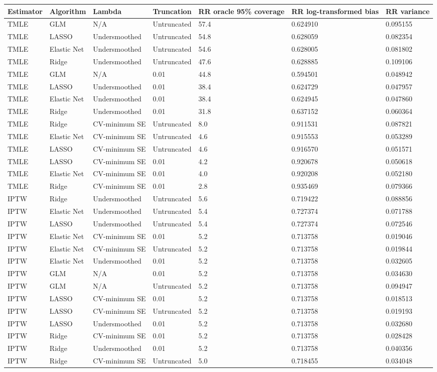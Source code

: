 
\begin{longtable}[l]{lllllll}
\toprule
Estimator & Algorithm & Lambda & Truncation & RR oracle 95\% coverage & RR log-transformed bias & RR variance\\
\midrule
TMLE & GLM & N/A & Untruncated & 57.4 & 0.624910 & 0.095155\\
TMLE & LASSO & Undersmoothed & Untruncated & 54.8 & 0.628059 & 0.082354\\
TMLE & Elastic Net & Undersmoothed & Untruncated & 54.6 & 0.628005 & 0.081802\\
TMLE & Ridge & Undersmoothed & Untruncated & 47.6 & 0.628885 & 0.109106\\
TMLE & GLM & N/A & 0.01 & 44.8 & 0.594501 & 0.048942\\
TMLE & LASSO & Undersmoothed & 0.01 & 38.4 & 0.624729 & 0.047957\\
TMLE & Elastic Net & Undersmoothed & 0.01 & 38.4 & 0.624945 & 0.047860\\
TMLE & Ridge & Undersmoothed & 0.01 & 31.8 & 0.637152 & 0.060364\\
TMLE & Ridge & CV-minimum SE & Untruncated & 8.0 & 0.911531 & 0.087821\\
TMLE & Elastic Net & CV-minimum SE & Untruncated & 4.6 & 0.915553 & 0.053289\\
TMLE & LASSO & CV-minimum SE & Untruncated & 4.6 & 0.916570 & 0.051571\\
TMLE & LASSO & CV-minimum SE & 0.01 & 4.2 & 0.920678 & 0.050618\\
TMLE & Elastic Net & CV-minimum SE & 0.01 & 4.0 & 0.920208 & 0.052180\\
TMLE & Ridge & CV-minimum SE & 0.01 & 2.8 & 0.935469 & 0.079366\\
IPTW & Ridge & Undersmoothed & Untruncated & 5.6 & 0.719422 & 0.088856\\
IPTW & Elastic Net & Undersmoothed & Untruncated & 5.4 & 0.727374 & 0.071788\\
IPTW & LASSO & Undersmoothed & Untruncated & 5.4 & 0.727374 & 0.072546\\
IPTW & Elastic Net & CV-minimum SE & 0.01 & 5.2 & 0.713758 & 0.019046\\
IPTW & Elastic Net & CV-minimum SE & Untruncated & 5.2 & 0.713758 & 0.019844\\
IPTW & Elastic Net & Undersmoothed & 0.01 & 5.2 & 0.713758 & 0.032605\\
IPTW & GLM & N/A & 0.01 & 5.2 & 0.713758 & 0.034630\\
IPTW & GLM & N/A & Untruncated & 5.2 & 0.713758 & 0.094947\\
IPTW & LASSO & CV-minimum SE & 0.01 & 5.2 & 0.713758 & 0.018513\\
IPTW & LASSO & CV-minimum SE & Untruncated & 5.2 & 0.713758 & 0.019193\\
IPTW & LASSO & Undersmoothed & 0.01 & 5.2 & 0.713758 & 0.032680\\
IPTW & Ridge & CV-minimum SE & 0.01 & 5.2 & 0.713758 & 0.028428\\
IPTW & Ridge & Undersmoothed & 0.01 & 5.2 & 0.713758 & 0.040356\\
IPTW & Ridge & CV-minimum SE & Untruncated & 5.0 & 0.718455 & 0.034048\\
\bottomrule
\end{longtable}
